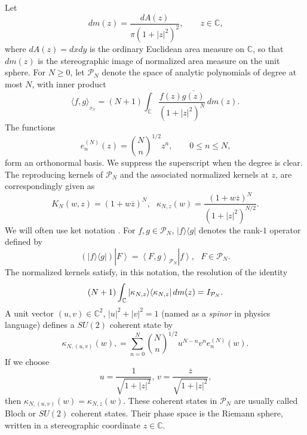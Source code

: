 \documentclass[12pt]{amsart}
\theoremstyle{plain}
\theoremstyle{definition}
\theoremstyle{remark}
\numberwithin{equation}{section}
\newcommand{\1}{\mathbf 1}
\begin{document}
Let 
\begin{equation*}
dm(z)=\frac{dA(z)}{\pi (1+|z|^{2})^{2}},\qquad z\in \mathbb{C}\text{,}
\end{equation*}%
where $dA(z)=dxdy$ is the ordinary Euclidean area measure on $\mathbb{C}$,
so that $dm(z)$ is the stereographic image of normalized area measure on the
unit sphere. For $N\geq 0$, let $\mathcal{P}_{N}$ denote the space of
analytic polynomials of degree at most $N$, with inner product 
\begin{equation*}
\langle f,g\rangle _{_{\mathcal{P}_{N}}}=(N+1)\int_{\mathbb{C}}\frac{f(z)%
\overline{g(z)}}{(1+|z|^{2})^{N}}\,dm(z)\text{.}
\end{equation*}%
The functions 
\begin{equation}
e_{n}^{(N)}(z)=\binom{N}{n}^{1/2}z^{n},\qquad 0\leq n\leq N\text{,}
\label{monomialBasis}
\end{equation}%
form an orthonormal basis. We suppress the superscript when the degree is
clear. The reproducing kernels of $\mathcal{P}_{N}$ and the associated
normalized kernels at $z$, are correspondingly given as 
\begin{equation*}
K_{N}(w,z)=(1+w\overline{z})^{N},\text{ \ \ \ \ \ \ \ \ \ \ \ \ \ }\kappa
_{N,z}(w)=\frac{(1+w\overline{z})^{N}}{(1+|z|^{2})^{N/2}}\text{.}
\end{equation*}%
We will often use ket notation \cite[Chapter 1]{Petz}.
For $f,g\in \mathcal{P}_{N}$, $|f\rangle \langle g|$ denotes the rank-$1$
operator defined by 
\begin{equation*}
\left( |f\rangle \langle g|\right) |\left. F\right\rangle =\left\langle
F,g\right\rangle _{\mathcal{P}_{N}}|\left. f\right\rangle ,\text{ \ \ \ \ }%
F\in \mathcal{P}_{N}\text{.}
\end{equation*}%
The normalized kernels satisfy, in this notation, the resolution of the
identity 
\begin{equation}
(N+1)\int_{\mathbb{C}}|\kappa _{N,z}\rangle \langle \kappa _{N,z}|\,dm(z)=I_{%
\mathcal{P}_{N}}\text{.}  \label{eq:resolution}
\end{equation}%
A unit vector $(u,v)\in \mathbb{C}^{2}$, $|u|^{2}+|v|^{2}=1$ (named as a 
\emph{spinor} in physics language) defines a $SU(2)$ coherent state by 
\begin{equation}
\kappa _{N,(u,v)}(w),=\sum_{n=0}^{N}\binom{N}{n}%
^{1/2}u^{N-n}v^{n}e_{n}^{(N)}(w)\text{.}  \label{eq:spincoherent}
\end{equation}%
If we choose%
\begin{equation*}
u=\frac{1}{\sqrt{1+\left\vert z\right\vert ^{2}}}\text{, \ \ \ \ \ \ \ \ }v=%
\frac{\overline{z}}{\sqrt{1+\left\vert z\right\vert ^{2}}}\text{,}
\end{equation*}%
then $\kappa _{N,(u,v)}(w)=\kappa _{N,z}(w)$. These coherent states in $%
\mathcal{P}_{N}$ are usually called Bloch or $SU(2)$ coherent states. Their
phase space is the Riemann sphere, written in a stereographic coordinate $%
z\in \mathbb{C}$.
\end{document}
